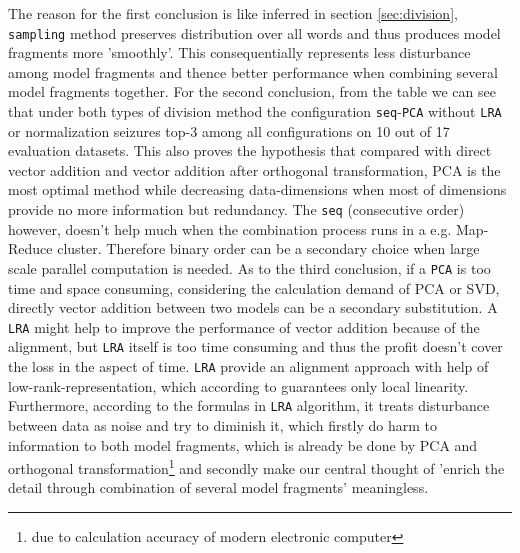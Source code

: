 The reason for the first conclusion is like inferred in section \ref{sec:division}, \verb|sampling| method preserves distribution over all words and thus produces model fragments more 'smoothly'. This consequentially represents less disturbance among model fragments and thence better performance when combining several model fragments together. For the second conclusion, from the table we can see that under both types of division method the configuration \verb|seq|-\verb|PCA| without \verb|LRA| or normalization seizures top-3 among all configurations on 10 out of 17 evaluation datasets. This also proves the hypothesis that compared with direct vector addition and vector addition after orthogonal transformation, PCA is the most optimal method while decreasing data-dimensions when most of dimensions provide no more information but redundancy. The \verb|seq| (consecutive order) however, doesn't help much when the combination process runs in a e.g. Map-Reduce cluster. Therefore binary order can be a secondary choice when large scale parallel computation is needed. As to the third conclusion, if a \verb|PCA| is too time and space consuming, considering the calculation demand of PCA or SVD, directly vector addition between two models can be a secondary substitution. A \verb|LRA| might help to improve the performance of vector addition because of the alignment, but \verb|LRA| itself is too time consuming and thus the profit doesn't cover the loss in the aspect of time. \verb|LRA| provide an alignment approach with help of low-rank-representation, which according to \cite{boucher2015aligning} guarantees only local linearity. Furthermore, according to the formulas in \verb|LRA| algorithm, it treats disturbance between data as noise and try to diminish it, which firstly do harm to information to both model fragments, which is already be done by PCA and orthogonal transformation\footnote{due to calculation accuracy of modern electronic computer} and secondly make our central thought of 'enrich the detail through combination of several model fragments' meaningless.
